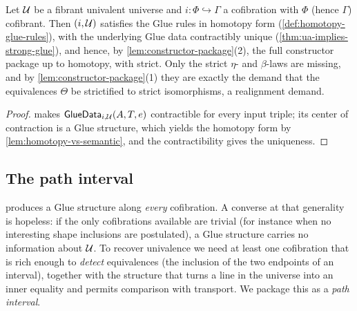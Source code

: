 \begin{corollary}\label{cor:ua-gives-homotopy-form}
	Let $\mathcal{U}$ be a fibrant univalent universe and $i:\Phi\hookrightarrow\Gamma$
	a cofibration with $\Phi$ (hence $\Gamma$) cofibrant. Then $(i,\mathcal{U})$
	satisfies the Glue rules in homotopy form
	(\cref{def:homotopy-glue-rules}), with the underlying Glue data
	contractibly unique
	(\cref{thm:ua-implies-strong-glue}), and hence, by
	\cref{lem:constructor-package}(2), the full constructor package up to
	homotopy, with  strict. Only the strict $\eta$- and
	$\beta$-laws are missing, and by \cref{lem:constructor-package}(1) they
	are exactly the demand that the equivalences $\Theta$ be strictified to
	strict isomorphisms, a realignment demand.
\end{corollary}
\begin{proof}
	 makes
	$\mathsf{GlueData}_{i,\mathcal{U}}(A,T,e)$ contractible for every input triple;
	its center of contraction is a Glue structure, which
	yields the homotopy form by \cref{lem:homotopy-vs-semantic}, and the
	contractibility gives the uniqueness.
\end{proof}

\subsection{The path interval}\label{sec:path-interval}

 produces a Glue structure along
\emph{every} cofibration. A converse at that generality is hopeless: if the
only cofibrations available are trivial (for instance when no interesting shape
inclusions are postulated), a Glue structure carries no information about
$\mathcal{U}$. To recover univalence we need at least one cofibration that is rich enough to
\emph{detect} equivalences (the inclusion of the two endpoints of an
interval), together with the structure that turns a line in the universe into
an inner equality and permits comparison with transport. We package this as a \emph{path
interval}.


